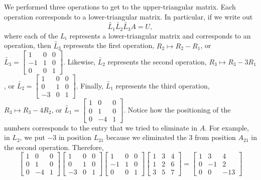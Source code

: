 \documentclass[letterpaper]{article}
\newcommand{\0}{\mathbf{0}}
\begin{document}
\begin{mdframed}
\begin{mdframed}
        We performed three operations to get to the upper-triangular matrix. Each operation corresponds to a lower-triangular matrix. In particular, if we write out 
        \[\tilde{L_1} \tilde{L_2} \tilde{L_3} A = U,\]
        where each of the $L_i$ represents a lower-triangular matrix and corresponds to an operation, then $\tilde{L_3}$ represents the first operation, $R_2 \mapsto R_2 - R_1$, or $\tilde{L_3} = \begin{bmatrix}
            1 & 0 & 0 \\ 
            -1 & 1 & 0 \\ 
            0 & 0 & 1
        \end{bmatrix}$. Likewise, $\tilde{L_2}$ represents the second operation, $R_3 \mapsto R_3 - 3R_1$, or $\tilde{L_2} = \begin{bmatrix}
            1 & 0 & 0 \\ 
            0 & 1 & 0 \\ 
            -3 & 0 & 1
        \end{bmatrix}$. Finally, $\tilde{L_1}$ represents the third operation, $R_3 \mapsto R_3 - 4R_2$, or $\tilde{L_1} = \begin{bmatrix}
            1 & 0 & 0 \\ 
            0 & 1 & 0 \\ 
            0 & -4 & 1
        \end{bmatrix}$. 
        Notice how the positioning of the numbers corresponds to the entry that we tried to eliminate in $A$. For example, in $L_2$, we put $-3$ in position $L_{21}$ because we eliminated the $3$ from position $A_{21}$ in the second operation. Therefore, 
        \[\begin{bmatrix}
            1 & 0 & 0 \\ 
            0 & 1 & 0 \\ 
            0 & -4 & 1
        \end{bmatrix} \begin{bmatrix}
            1 & 0 & 0 \\ 
            0 & 1 & 0 \\ 
            -3 & 0 & 1
        \end{bmatrix} \begin{bmatrix}
            1 & 0 & 0 \\ 
            -1 & 1 & 0 \\ 
            0 & 0 & 1
        \end{bmatrix} \begin{bmatrix}
            1 & 3 & 4 \\ 
            1 & 2 & 6 \\ 
            3 & 5 & 7
        \end{bmatrix} = \begin{bmatrix}
            1 & 3 & 4 \\ 
            0 & -1 & 2 \\ 
            0 & 0 & -13
        \end{bmatrix}\]


\end{mdframed}
\end{mdframed}
\end{document}
